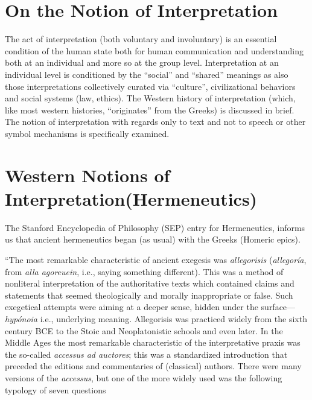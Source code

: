 \section*{On the Notion of Interpretation}

The act of interpretation (both voluntary and involuntary) is an essential condition of the human state both for human communication and understanding both at an individual and more so at the group level. Interpretation at an individual level is conditioned by the “social” and “shared” meanings as also those interpretations collectively curated via “culture”, civilizational behaviors and social systems (law, ethics). The Western history of interpretation (which, like most western histories, “originates” from the Greeks) is discussed in brief. The notion of interpretation with regards only to text and not to speech or other symbol mechanisms is specifically examined.


\section*{Western Notions of Interpretation\hfil \break (Hermeneutics)}

The Stanford Encyclopedia of Philosophy (SEP) entry for Herme\-neutics, informs us that ancient hermeneutics began (as usual) with the Greeks (Homeric epics).

\begin{myquote}
“The most remarkable characteristic of ancient exegesis was \textit{allegorisis} (\textit{allegoría}, from \textit{alla agoreuein}, i.e., saying something different). This was a method of nonliteral interpretation of the authoritative texts which contained claims and statements that seemed theologically and morally inappropriate or false. Such exegetical attempts were aiming at a deeper sense, hidden under the surface—\textit{hypónoia} i.e., underlying meaning. Allegorisis was practiced widely from the sixth century BCE to the Stoic and Neoplatonistic schools and even later. In the Middle Ages the most remarkable characteristic of the interpretative praxis was the so-called \textit{accessus ad auctores}; this was a standardized introduction that preceded the editions and commentaries of (classical) authors. There were many versions of the \textit{accessus}, but one of the more widely used was the following typology of seven questions 
\end{myquote}

